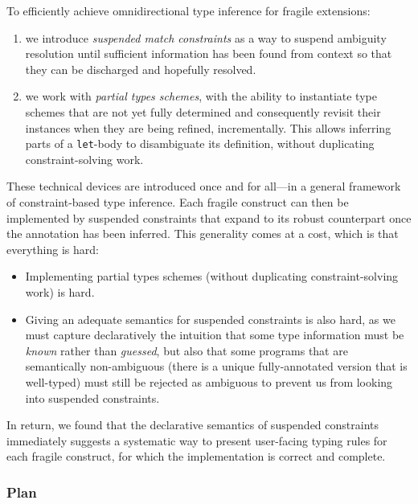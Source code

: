\documentclass[acmsmall,screen,nonacm,review]{acmart}
\begin{document}
To efficiently achieve omnidirectional type inference for fragile \ML
extensions:
\begin{enumerate}
\item
  we introduce \emph{suspended match constraints} as a way to suspend
  ambiguity resolution until sufficient information has been found from
  context so that they can be discharged and hopefully resolved.
\item
  we work with \emph{partial types schemes}, \ie with the ability to instantiate type
  schemes that are not yet fully determined and consequently revisit their
  instances when they are being refined, incrementally. This allows
  inferring parts of a \texttt{let}-body to disambiguate its definition,
  without duplicating constraint-solving work.
\end{enumerate}

These technical devices are introduced once and for all---in a general
framework of constraint-based type inference. Each fragile \ML construct can
then be implemented by suspended constraints that expand to its robust
counterpart once the annotation has been inferred. This generality comes at
a cost, which is that everything is hard:
\begin{itemize}
\item Implementing partial types schemes (without duplicating
  constraint-solving work) is hard.
\item Giving an adequate semantics for suspended constraints is also hard, as we
  must capture declaratively the intuition that some type information must be
  \emph{known} rather than \emph{guessed}, but also that some programs
  that are semantically non-ambiguous (there is a unique fully-annotated
  version that is well-typed) must still be rejected as ambiguous to prevent
  us from looking into suspended constraints.
\end{itemize}
In return, we found that the declarative semantics of suspended constraints
immediately suggests a systematic way to present user-facing typing rules
for each fragile construct, for which the implementation is correct and
complete.

\subsubsection* {Plan}
\end{document}

